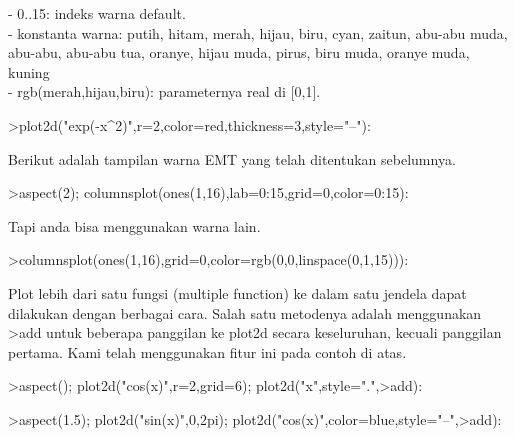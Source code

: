 \documentclass{article}
\begin{document}
\begin{eulernotebook}
\begin{eulercomment}
\begin{eulercomment}
\begin{eulercomment}
\begin{eulercomment}
\begin{eulercomment}
\begin{eulercomment}
\begin{eulercomment}
- 0..15: indeks warna default.\\
- konstanta warna: putih, hitam, merah, hijau, biru, cyan, zaitun,
abu-abu muda, abu-abu, abu-abu tua, oranye, hijau muda, pirus, biru
muda, oranye muda, kuning\\
- rgb(merah,hijau,biru): parameternya real di [0,1].
\end{eulercomment}
\begin{eulerprompt}
>plot2d("exp(-x^2)",r=2,color=red,thickness=3,style="--"):
\end{eulerprompt}
\begin{eulercomment}
Berikut adalah tampilan warna EMT yang telah ditentukan sebelumnya.
\end{eulercomment}
\begin{eulerprompt}
>aspect(2); columnsplot(ones(1,16),lab=0:15,grid=0,color=0:15):
\end{eulerprompt}
\begin{eulercomment}
Tapi anda bisa menggunakan warna lain.
\end{eulercomment}
\begin{eulerprompt}
>columnsplot(ones(1,16),grid=0,color=rgb(0,0,linspace(0,1,15))):
\end{eulerprompt}
\begin{eulercomment}
Plot lebih dari satu fungsi (multiple function) ke dalam satu jendela
dapat dilakukan dengan berbagai cara. Salah satu metodenya adalah
menggunakan \textgreater{}add untuk beberapa panggilan ke plot2d secara
keseluruhan, kecuali panggilan pertama. Kami telah menggunakan fitur
ini pada contoh di atas.
\end{eulercomment}
\begin{eulerprompt}
>aspect(); plot2d("cos(x)",r=2,grid=6); plot2d("x",style=".",>add):
\end{eulerprompt}
\begin{eulerprompt}
>aspect(1.5); plot2d("sin(x)",0,2pi); plot2d("cos(x)",color=blue,style="--",>add):
\end{eulerprompt}
\begin{eulercomment}

\end{eulercomment}
\end{eulercomment}
\end{eulercomment}
\end{eulercomment}
\end{eulercomment}
\end{eulercomment}
\end{eulercomment}
\end{eulernotebook}
\end{document}
